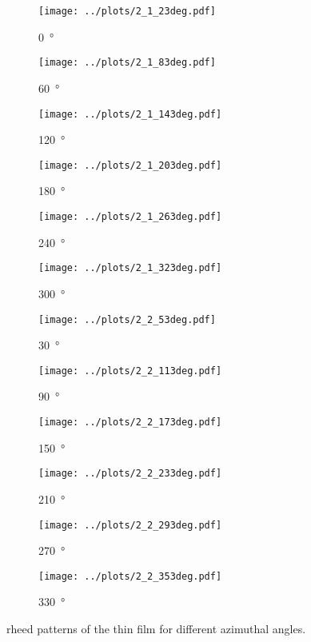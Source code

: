 \begin{figure*}
    \centering
    \begin{subfigure}{0.2\linewidth}
        \texttt{[image: ../plots/2\_1\_23deg.pdf]}
        \caption{\qty{0}{\degree}}
    \end{subfigure}
    \begin{subfigure}{0.2\linewidth}
        \texttt{[image: ../plots/2\_1\_83deg.pdf]}
        \caption{\qty{60}{\degree}}
    \end{subfigure}
    \begin{subfigure}{0.2\linewidth}
        \texttt{[image: ../plots/2\_1\_143deg.pdf]}
        \caption{\qty{120}{\degree}}
    \end{subfigure}
    \begin{subfigure}{0.2\linewidth}
        \texttt{[image: ../plots/2\_1\_203deg.pdf]}
        \caption{\qty{180}{\degree}}
    \end{subfigure}
    \begin{subfigure}{0.2\linewidth}
        \texttt{[image: ../plots/2\_1\_263deg.pdf]}
        \caption{\qty{240}{\degree}}
    \end{subfigure}
    \begin{subfigure}{0.2\linewidth}
        \texttt{[image: ../plots/2\_1\_323deg.pdf]}
        \caption{\qty{300}{\degree}}
    \end{subfigure}
    \begin{subfigure}{0.2\linewidth}
        \texttt{[image: ../plots/2\_2\_53deg.pdf]}
        \caption{\qty{30}{\degree}}
    \end{subfigure}
    \begin{subfigure}{0.2\linewidth}
        \texttt{[image: ../plots/2\_2\_113deg.pdf]}
        \caption{\qty{90}{\degree}}
    \end{subfigure}
    \begin{subfigure}{0.2\linewidth}
        \texttt{[image: ../plots/2\_2\_173deg.pdf]}
        \caption{\qty{150}{\degree}}
    \end{subfigure}
    \begin{subfigure}{0.2\linewidth}
        \texttt{[image: ../plots/2\_2\_233deg.pdf]}
        \caption{\qty{210}{\degree}}
    \end{subfigure}
    \begin{subfigure}{0.2\linewidth}
        \texttt{[image: ../plots/2\_2\_293deg.pdf]}
        \caption{\qty{270}{\degree}}
    \end{subfigure}
    \begin{subfigure}{0.2\linewidth}
        \texttt{[image: ../plots/2\_2\_353deg.pdf]}
        \caption{\qty{330}{\degree}}
    \end{subfigure}

    \caption{\ac{rheed} patterns of the  thin film for different azimuthal 
    angles. }
    \label{fig:rheed2}
\end{figure*}